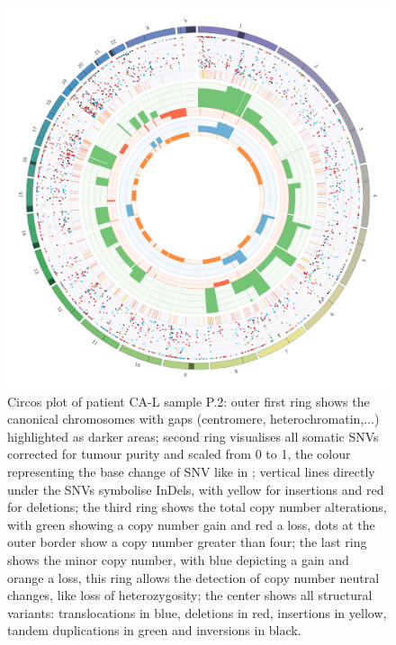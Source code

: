 \begin{figure}[ht]
\centering
\includegraphics[width=.99\linewidth]{Figures/CASCADE/CA86/CA86-17B037524-1-A.circos.png}
\caption[Circos plot of patient CA-L sample P.2]{Circos plot of patient CA-L sample P.2: outer first ring shows the canonical chromosomes with gaps (centromere, heterochromatin,...) highlighted as darker areas; second ring visualises all somatic SNVs corrected for tumour purity and scaled from 0 to 1, the colour representing the base change of SNV like in \protect\textcite{Alexandrov2013}; vertical lines directly under the SNVs symbolise InDels, with yellow for insertions and red for deletions; the third ring shows the total copy number alterations, with green showing a copy number gain and red a loss, dots at the outer border show a copy number greater than four; the last ring shows the minor copy number, with blue depicting a gain and orange a loss, this ring allows the detection of copy number neutral changes, like loss of heterozygosity; the center shows all structural variants: translocations in blue, deletions in red, insertions in yellow, tandem duplications in green and inversions in black.} \label{fig:ca86.p2circos}
\end{figure}

